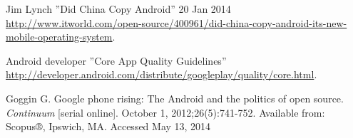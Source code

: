 \documentclass[conference]{IEEEtran}
\begin{document}
\begin{thebibliography}{1}


Jim Lynch ''Did China Copy Android''  20 Jan 2014 \url{http://www.itworld.com/open-source/400961/did-china-copy-android-its-new-mobile-operating-system}.

Android developer ''Core App Quality Guidelines''
\url{http://developer.android.com/distribute/googleplay/quality/core.html}.

Goggin G. Google phone rising: The Android and the politics of open source. \textit{Continuum} [serial online]. October 1, 2012;26(5):741-752. Available from: Scopus®, Ipswich, MA. Accessed May 13, 2014

\end{thebibliography}
\end{document}
